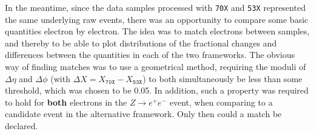\documentclass[10pt]{article}
\begin{document}
In the meantime, since the data samples processed with \texttt{70X} and \texttt{53X} represented the same underlying raw events, there was an opportunity to compare some basic quantities electron by electron. The idea was to match electrons between samples, and thereby to be able to plot distributions of the fractional changes and differences between the quantities in each of the two frameworks. The obvious way of finding matches was to use a geometrical method, requiring the moduli of $\Delta \eta$ and $\Delta \phi$  (with $\Delta X = X_\texttt{70X} -X_\texttt{53X}$) to both simultaneously be less than some threshold, which was chosen to be 0.05. In addition, such a property was required to hold for \textbf{both} electrons in the $Z\rightarrow e^+ e^-$ event, when comparing to a candidate event in the alternative framework. Only then could a match be declared.
\end{document}
